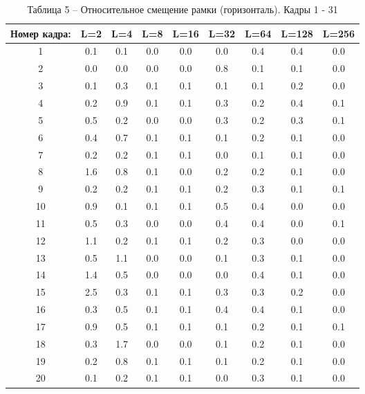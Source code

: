 \begin{table}[h!]
\caption*{Таблица 5 -- Относительное смещение рамки (горизонталь). Кадры 1 - 31 }
\begin{tabular}{|c|c|c|c|c|c|c|c|c|}
\hline
Номер кадра: & L=2 & L=4 & L=8 & L=16 & L=32 & L=64 & L=128 & L=256 \\ \hline
1            & 0.1 & 0.1 & 0.0 & 0.0  & 0.0  & 0.4  & 0.4   & 0.0   \\ \hline
2            & 0.0 & 0.0 & 0.0 & 0.0  & 0.8  & 0.1  & 0.1   & 0.0   \\ \hline
3            & 0.1 & 0.3 & 0.1 & 0.1  & 0.1  & 0.1  & 0.2   & 0.0   \\ \hline
4            & 0.2 & 0.9 & 0.1 & 0.1  & 0.3  & 0.2  & 0.4   & 0.1   \\ \hline
5            & 0.5 & 0.2 & 0.0 & 0.0  & 0.3  & 0.2  & 0.3   & 0.1   \\ \hline
6            & 0.4 & 0.7 & 0.1 & 0.1  & 0.1  & 0.2  & 0.1   & 0.0   \\ \hline
7            & 0.2 & 0.2 & 0.1 & 0.1  & 0.0  & 0.1  & 0.1   & 0.0   \\ \hline
8            & 1.6 & 0.8 & 0.1 & 0.0  & 0.2  & 0.2  & 0.1   & 0.0   \\ \hline
9            & 0.2 & 0.2 & 0.1 & 0.1  & 0.2  & 0.3  & 0.1   & 0.1   \\ \hline
10           & 0.9 & 0.1 & 0.1 & 0.1  & 0.5  & 0.4  & 0.0   & 0.0   \\ \hline
11           & 0.5 & 0.3 & 0.0 & 0.0  & 0.4  & 0.4  & 0.0   & 0.1   \\ \hline
12           & 1.1 & 0.2 & 0.1 & 0.1  & 0.2  & 0.3  & 0.0   & 0.0   \\ \hline
13           & 0.5 & 1.1 & 0.0 & 0.0  & 0.1  & 0.3  & 0.1   & 0.0   \\ \hline
14           & 1.4 & 0.5 & 0.0 & 0.0  & 0.0  & 0.4  & 0.1   & 0.0   \\ \hline
15           & 2.5 & 0.3 & 0.1 & 0.1  & 0.3  & 0.3  & 0.2   & 0.0   \\ \hline
16           & 0.3 & 0.5 & 0.1 & 0.1  & 0.4  & 0.4  & 0.1   & 0.0   \\ \hline
17           & 0.9 & 0.5 & 0.1 & 0.1  & 0.1  & 0.2  & 0.1   & 0.1   \\ \hline
18           & 0.3 & 1.7 & 0.0 & 0.0  & 0.1  & 0.2  & 0.1   & 0.0   \\ \hline
19           & 0.2 & 0.8 & 0.1 & 0.1  & 0.1  & 0.2  & 0.1   & 0.0   \\ \hline
20           & 0.1 & 0.2 & 0.1 & 0.1  & 0.0  & 0.3  & 0.1   & 0.0   \\ \hline

\end{tabular}
\end{table}
